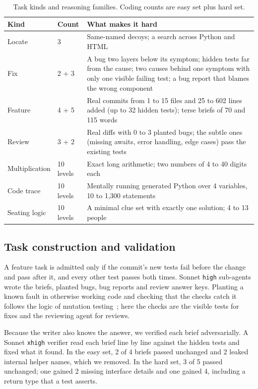\begin{table}[H]
\centering
\caption{Task kinds and reasoning families. Coding counts are easy set plus hard set.}
\label{tab:task-sets}
\small
\setlength{\tabcolsep}{6pt}
\renewcommand{\arraystretch}{1.2}
\begin{tabular}{L{2.5cm} L{1.5cm} L{9.5cm}}
\toprule
\textbf{Kind} & \textbf{Count} & \textbf{What makes it hard} \\
\midrule
Locate & 3 & Same-named decoys; a search across Python and HTML \\
Fix & 2 + 3 & A bug two layers below its symptom; hidden tests far from the cause; two causes behind one symptom with only one visible failing test; a bug report that blames the wrong component \\
Feature & 4 + 5 & Real commits from 1 to 15 files and 25 to 602 lines added (up to 32 hidden tests); terse briefs of 70 and 115 words \\
Review & 3 + 2 & Real diffs with 0 to 3 planted bugs; the subtle ones (missing awaits, error handling, edge cases) pass the existing tests \\
\midrule
Multiplication & 10 levels & Exact long arithmetic; two numbers of 4 to 40 digits each \\
Code trace & 10 levels & Mentally running generated Python over 4 variables, 10 to 1,300 statements \\
Seating logic & 10 levels & A minimal clue set with exactly one solution; 4 to 13 people \\
\bottomrule
\end{tabular}
\end{table}

\subsection{Task construction and validation}
\label{sec:validation}

A feature task is admitted only if the commit's new tests fail before the
change and pass after it, and every other test passes both times. Sonnet
\texttt{high} sub-agents wrote the briefs, planted bugs, bug reports and
review answer keys. Planting a known fault in otherwise working code and
checking that the checks catch it follows the logic of mutation
testing~\cite{demillo1978hints}; here the checks are the visible tests for
fixes and the reviewing agent for reviews.

Because the writer also knows the answer, we verified each brief
adversarially. A Sonnet \texttt{xhigh} verifier read each brief line by
line against the hidden tests and fixed what it found. In the easy set, 2
of 4 briefs passed unchanged and 2 leaked internal helper names, which we
removed. In the hard set, 3 of 5 passed unchanged; one gained 2 missing
interface details and one gained 4, including a return type that a test
asserts.

